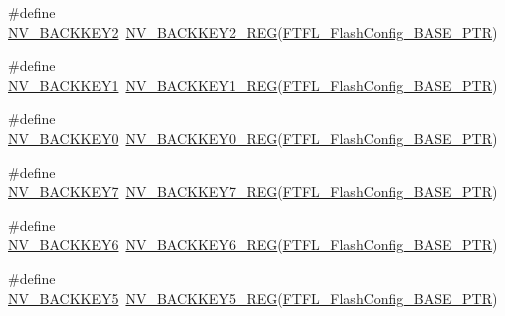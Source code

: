 \begin{DoxyCompactItemize}
\item 
\#define \hyperlink{group___n_v___register___accessor___macros_ga51642a3d84acba43ff0aa3925226ab32}{N\+V\+\_\+\+B\+A\+C\+K\+K\+E\+Y2}~\hyperlink{group___n_v___register___accessor___macros_gaad90d55fc5c046a8e8508b04cbe2fbbb}{N\+V\+\_\+\+B\+A\+C\+K\+K\+E\+Y2\+\_\+\+R\+EG}(\hyperlink{group___n_v___peripheral_gad199a235b90fe3e6afb977f2d6a9c565}{F\+T\+F\+L\+\_\+\+Flash\+Config\+\_\+\+B\+A\+S\+E\+\_\+\+P\+TR})
\item 
\#define \hyperlink{group___n_v___register___accessor___macros_gae849f8e6eaa76305b07c567463074dc9}{N\+V\+\_\+\+B\+A\+C\+K\+K\+E\+Y1}~\hyperlink{group___n_v___register___accessor___macros_gaa618f324e87cf548f4736270e46fcc57}{N\+V\+\_\+\+B\+A\+C\+K\+K\+E\+Y1\+\_\+\+R\+EG}(\hyperlink{group___n_v___peripheral_gad199a235b90fe3e6afb977f2d6a9c565}{F\+T\+F\+L\+\_\+\+Flash\+Config\+\_\+\+B\+A\+S\+E\+\_\+\+P\+TR})
\item 
\#define \hyperlink{group___n_v___register___accessor___macros_gadb8e2eb4db4de2a485b31c2a1dd393af}{N\+V\+\_\+\+B\+A\+C\+K\+K\+E\+Y0}~\hyperlink{group___n_v___register___accessor___macros_ga905f2d4f792d634634d339e5b6170fe1}{N\+V\+\_\+\+B\+A\+C\+K\+K\+E\+Y0\+\_\+\+R\+EG}(\hyperlink{group___n_v___peripheral_gad199a235b90fe3e6afb977f2d6a9c565}{F\+T\+F\+L\+\_\+\+Flash\+Config\+\_\+\+B\+A\+S\+E\+\_\+\+P\+TR})
\item 
\#define \hyperlink{group___n_v___register___accessor___macros_gaf4c4eb8173a514a0fe632f29e80423d4}{N\+V\+\_\+\+B\+A\+C\+K\+K\+E\+Y7}~\hyperlink{group___n_v___register___accessor___macros_ga7f6090f0eb664b59d0e6e79b492fe8e4}{N\+V\+\_\+\+B\+A\+C\+K\+K\+E\+Y7\+\_\+\+R\+EG}(\hyperlink{group___n_v___peripheral_gad199a235b90fe3e6afb977f2d6a9c565}{F\+T\+F\+L\+\_\+\+Flash\+Config\+\_\+\+B\+A\+S\+E\+\_\+\+P\+TR})
\item 
\#define \hyperlink{group___n_v___register___accessor___macros_ga74544d83ca29fc4d859726eb023dadb9}{N\+V\+\_\+\+B\+A\+C\+K\+K\+E\+Y6}~\hyperlink{group___n_v___register___accessor___macros_ga9d64e9e2568804d0cf1de4cb5a1d3f1f}{N\+V\+\_\+\+B\+A\+C\+K\+K\+E\+Y6\+\_\+\+R\+EG}(\hyperlink{group___n_v___peripheral_gad199a235b90fe3e6afb977f2d6a9c565}{F\+T\+F\+L\+\_\+\+Flash\+Config\+\_\+\+B\+A\+S\+E\+\_\+\+P\+TR})
\item 
\#define \hyperlink{group___n_v___register___accessor___macros_ga7b8e49b6530c2192672343b7f32ae5e8}{N\+V\+\_\+\+B\+A\+C\+K\+K\+E\+Y5}~\hyperlink{group___n_v___register___accessor___macros_gaeeb967dc21f8077cef911eae743d7f12}{N\+V\+\_\+\+B\+A\+C\+K\+K\+E\+Y5\+\_\+\+R\+EG}(\hyperlink{group___n_v___peripheral_gad199a235b90fe3e6afb977f2d6a9c565}{F\+T\+F\+L\+\_\+\+Flash\+Config\+\_\+\+B\+A\+S\+E\+\_\+\+P\+TR})

\end{DoxyCompactItemize}

